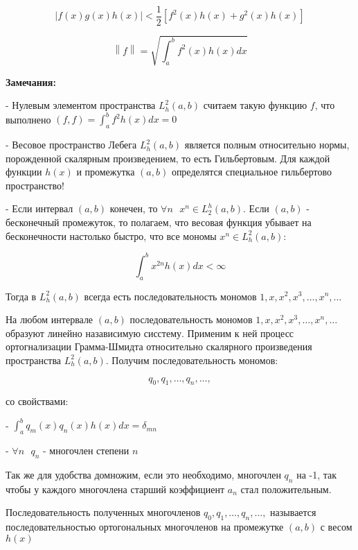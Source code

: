\documentclass[12pt, a4paper]{report}
\begin{document}
\[ \left\lvert f(x ) g(x )h(x )\right\rvert < \frac{1}{2 }  [f ^2 (x )h(x ) + g ^2 (x ) h(x )] \] 

\[ \left\lVert  f  \right\rVert = \sqrt{\int_{a }^{b } f ^2 ( x )h (x ) dx } \] 

\textbf{Замечания: } 

- Нулевым элементом пространства \( L^2 _h (a,b) \)  считаем такую функцию \( f  \), что выполнено \(\displaystyle  (f,f   ) = \int_{ a }^{b } f ^2 h( x )dx = 0  \) 

- Весовое пространство Лебега \( L^2 _h (a,b) \)  является полным относительно нормы, порожденной скалярным произведением, то есть Гильбертовым. Для каждой функции \( h (x ) \) и промежутка \( (a, b) \) определятся специальное гильбертово пространство! 

- Если интервал \( (a,b) \)  конечен, то \( \forall  n \text{ }  x^{n }  \in  L^ h _ 2 (a,b ). \) Если \( (a,b ) \) - бесконечный промежуток, то полагаем, что весовая функция убывает на бесконечности настолько быстро, что все мономы \( x^ n \in  L^2 _h (a,b ) \): 

\[ \int_{a }^{b } x^{2n } h(x )dx < \infty  \] 

Тогда в \( L^2 _h (a,b ) \) всегда есть последовательность мономов \( 1,x , x ^2, x ^3, \ldots, x^n, \ldots  \) 

На любом интервале \( (a,b ) \) последовательность мономов \(1,x , x ^2, x ^3, \ldots, x^n, \ldots  \) образуют линейно назависимую сисстему. Применим к ней  процесс ортогнализации Грамма-Шмидта относительно скалярного произведения пространства \( L^2 _h (a,b ) \). Получим последовательность мономов: 

\[ q_0,q_1, \ldots, q_n, \ldots,  \] 

со свойствами:

- \( \displaystyle  \int_{a }^{b } q_m (x ) q_n (x )h(x )dx = \delta _{mn}  \) 

- \( \forall  n \text{ }  q_n  \) - многочлен степени \( n \) 

Так же для удобства домножим, если это необходимо, многочлен \( q_n  \) на -1, так чтобы у каждого многочлена старший коэффициент \( a_n  \) стал положительным. 

\begin{definition}
    Последовательность полученных многочленов \( q_0,q_1, \ldots, q_n, \ldots,   \) называется последовательностью ортогональных многочленов на промежутке \( (a,b ) \) с весом \( h (x ) \)
\end{definition}
\end{document}
